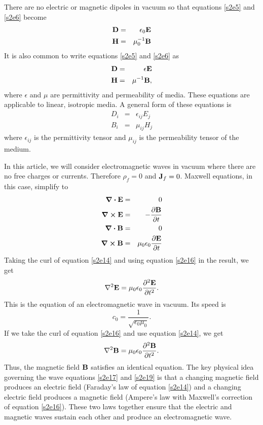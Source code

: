 \documentclass[11pt]{article}
\numberwithin{equation}{section}
\begin{document}
There are no electric or magnetic dipoles in vacuum so that equations
\eqref{s2e5} and \eqref{s2e6} become
\begin{eqnarray}
\vb{D} &=& \epsilon_0\vb{E} \label{s2e7} \\
\vb{H} &=& \mu_0^{-1}\vb{B} \label{s2e8}
\end{eqnarray}
It is also common to write equations \eqref{s2e5} and \eqref{s2e6} as
\begin{eqnarray}
\vb{D} &=& \epsilon\vb{E} \label{s2e9} \\
\vb{H} &=& \mu^{-1}\vb{B}, \label{s2e10}
\end{eqnarray}
where $\epsilon$ and $\mu$ are permittivity and permeability of media. These
equations are applicable to linear, isotropic media. A general form of these
equations is
\begin{eqnarray}
D_i &=& \epsilon_{ij}E_j \label{s2e11} \\
B_i &=& \mu_{ij}H_j \label{s2e12}
\end{eqnarray}
where $\epsilon_{ij}$ is the permittivity tensor and $\mu_{ij}$ is the
permeability tensor of the medium. 

In this article, we will consider electromagnetic waves in vacuum where there 
are no free charges or currents. Therefore $\rho_f = 0$ and $\vb{J}_f= 0$.
Maxwell equations, in this case, simplify to
\begin{eqnarray}
\div\vb{E} &=& 0 \label{s2e13} \\
\curl\vb{E} &=& -\pdv{\vb{B}}{t} \label{s2e14} \\
\div\vb{B} &=& 0 \label{s2e15} \\
\curl\vb{B} &=& \mu_0\epsilon_0\pdv{\vb{E}}{t} \label{s2e16}
\end{eqnarray}
Taking the curl of equation \eqref{s2e14} and using equation \eqref{s2e16}
in the result, we get
\begin{equation}\label{s2e17}
\laplacian\vb{E} = \mu_0\epsilon_0\pdv[2]{\vb{E}}{t}.
\end{equation}
This is the equation of an electromagnetic wave in vacuum. Its speed is
\begin{equation}\label{s2e18}
c_0 = \frac{1}{\sqrt{\epsilon_0\mu_0}}.
\end{equation}
If we take the curl of equation \eqref{s2e16} and use equation \eqref{s2e14},
we get
\begin{equation}\label{s2e19}
\laplacian\vb{B} = \mu_0\epsilon_0\pdv[2]{\vb{B}}{t}.
\end{equation}
Thus, the magnetic field $\vb{B}$ satisfies an identical equation. The key
physical idea governing the wave equations \eqref{s2e17} and \eqref{s2e19}
is that a changing magnetic field produces an electric field (Faraday's law
of equation \eqref{s2e14}) and a changing electric field produces a 
magnetic field (Ampere's law with Maxwell's correction of equation 
\eqref{s2e16}). These two laws together ensure that the electric and magnetic
waves sustain each other and produce an electromagnetic wave.
\end{document}
